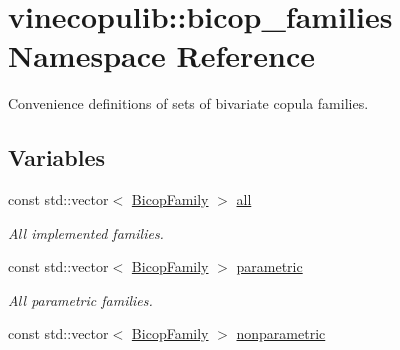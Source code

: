 \hypertarget{namespacevinecopulib_1_1bicop__families}{}\section{vinecopulib\+:\+:bicop\+\_\+families Namespace Reference}
\label{namespacevinecopulib_1_1bicop__families}


Convenience definitions of sets of bivariate copula families.  


\subsection*{Variables}
\begin{DoxyCompactItemize}
\item 
const std\+::vector$<$ \hyperlink{namespacevinecopulib_a42e95cc06d33896199caab0c11ad44f3}{Bicop\+Family} $>$ \hyperlink{namespacevinecopulib_1_1bicop__families_a5214a513f41ec23b74782aab96ea6774}{all}\hypertarget{namespacevinecopulib_1_1bicop__families_a5214a513f41ec23b74782aab96ea6774}{}\label{namespacevinecopulib_1_1bicop__families_a5214a513f41ec23b74782aab96ea6774}

\begin{DoxyCompactList}\small\item\em All implemented families. \end{DoxyCompactList}\item 
const std\+::vector$<$ \hyperlink{namespacevinecopulib_a42e95cc06d33896199caab0c11ad44f3}{Bicop\+Family} $>$ \hyperlink{namespacevinecopulib_1_1bicop__families_a76d66bb6cb03ae4de1cef3d1ed70ac16}{parametric}\hypertarget{namespacevinecopulib_1_1bicop__families_a76d66bb6cb03ae4de1cef3d1ed70ac16}{}\label{namespacevinecopulib_1_1bicop__families_a76d66bb6cb03ae4de1cef3d1ed70ac16}

\begin{DoxyCompactList}\small\item\em All parametric families. \end{DoxyCompactList}\item 
const std\+::vector$<$ \hyperlink{namespacevinecopulib_a42e95cc06d33896199caab0c11ad44f3}{Bicop\+Family} $>$ \hyperlink{namespacevinecopulib_1_1bicop__families_a01c7c990cc34b1b74d115858a52fcdc5}{nonparametric}\hypertarget{namespacevinecopulib_1_1bicop__families_a01c7c990cc34b1b74d115858a52fcdc5}{}\label{namespacevinecopulib_1_1bicop__families_a01c7c990cc34b1b74d115858a52fcdc5}


\end{DoxyCompactItemize}
